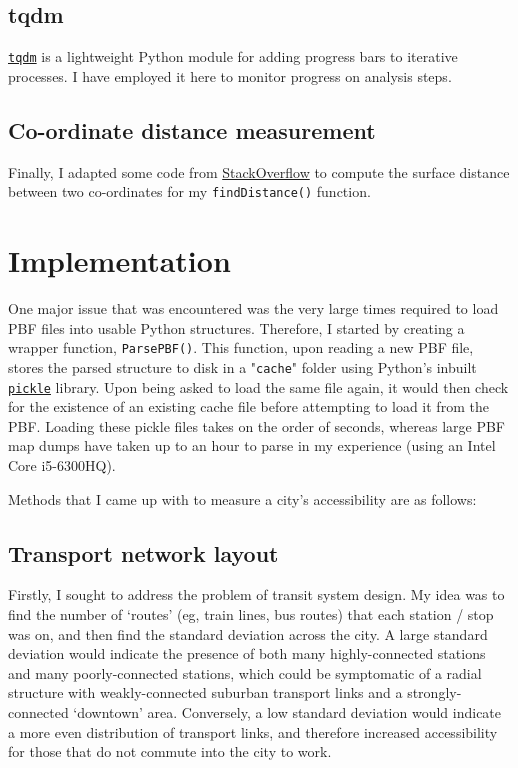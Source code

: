 \documentclass[12pt]{article} %
\begin{document}
\subsection{tqdm}
\href{https://tqdm.github.io/}{\texttt{tqdm}} is a lightweight Python module for adding progress bars to iterative processes. I have employed it here to monitor progress on analysis steps.

\subsection{Co-ordinate distance measurement}
Finally, I adapted some code from \href{https://stackoverflow.com/a/19412565}{StackOverflow} to compute the surface distance between two co-ordinates for my \texttt{findDistance()} function.


\section{Implementation}
One major issue that was encountered was the very large times required to load PBF files into usable Python structures. Therefore, I started by creating a wrapper function, \texttt{ParsePBF()}. This function, upon reading a new PBF file, stores the parsed structure to disk in a "\texttt{cache}" folder using Python's inbuilt \href{https://docs.python.org/3/library/pickle.html}{\texttt{pickle}} library. Upon being asked to load the same file again, it would then check for the existence of an existing cache file before attempting to load it from the PBF. Loading these pickle files takes on the order of seconds, whereas large PBF map dumps have taken up to an hour to parse in my experience (using an Intel Core i5-6300HQ).

Methods that I came up with to measure a city's accessibility are as follows:

\subsection{Transport network layout}
Firstly, I sought to address the problem of transit system design. My idea was to find the number of `routes' (eg, train lines, bus routes) that each station / stop was on, and then find the standard deviation across the city. A large standard deviation would indicate the presence of both many highly-connected stations and many poorly-connected stations, which could be symptomatic of a radial structure with weakly-connected suburban transport links and a strongly-connected `downtown' area. Conversely, a low standard deviation would indicate a more even distribution of transport links, and therefore increased accessibility for those that do not commute into the city to work.
\end{document}
